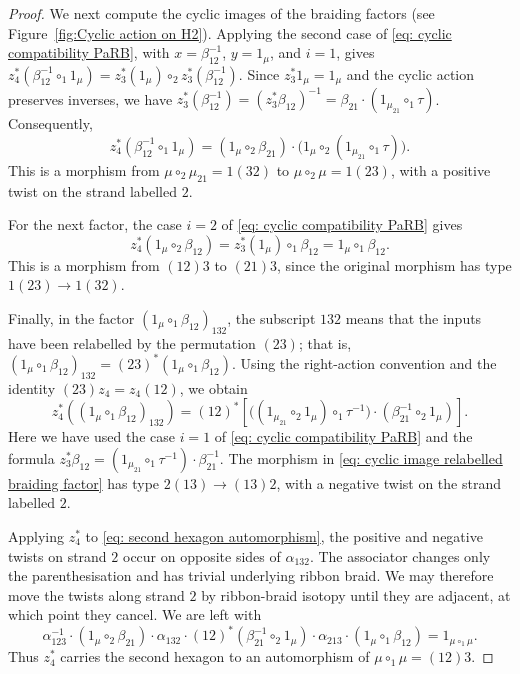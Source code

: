 \documentclass{amsart}
\newcommand{\twist}{\tau}
\theoremstyle{definition}
\numberwithin{equation}{section}
\begin{document}
\begin{proof}
We next compute the cyclic images of the braiding factors (see Figure~\ref{fig:Cyclic action on H2}). Applying
the second case of \eqref{eq: cyclic compatibility PaRB}, with
$x=\beta_{12}^{-1}$, $y=1_\mu$, and $i=1$, gives
$z_4^*(\beta_{12}^{-1}\circ_1 1_\mu)
=z_3^*(1_\mu)\circ_2z_3^*(\beta_{12}^{-1})$.
Since $z_3^*1_\mu=1_\mu$ and the cyclic action preserves inverses,
we have
$z_3^*(\beta_{12}^{-1})
=(z_3^*\beta_{12})^{-1}
=\beta_{21}\cdot(1_{\mu_{21}}\circ_1\twist)$.
Consequently,
\begin{equation}
\label{eq: cyclic image inverse braiding first insertion}
z_4^*(\beta_{12}^{-1}\circ_1 1_\mu) = (1_\mu\circ_2\beta_{21}) \cdot \bigl(1_\mu\circ_2 (1_{\mu_{21}}\circ_1\twist)\bigr).
\end{equation}
This is a morphism from
$\mu\circ_2\mu_{21}=1(32)$ to $\mu\circ_2\mu=1(23)$, with a positive twist on the strand labelled $2$.

For the next factor, the case $i=2$ of
\eqref{eq: cyclic compatibility PaRB} gives
\begin{equation}
\label{eq: cyclic image second braiding factor}
z_4^*(1_\mu\circ_2\beta_{12}) = z_3^*(1_\mu)\circ_1\beta_{12} = 1_\mu\circ_1\beta_{12}.
\end{equation}
This is a morphism from $(12)3$ to $(21)3$, since the original morphism has type $1(23)\to1(32)$.

Finally, in the factor
$(1_\mu\circ_1\beta_{12})_{132}$, the subscript $132$ means that the
inputs have been relabelled by the permutation $(23)$; that is,
$(1_\mu\circ_1\beta_{12})_{132}
=(23)^*(1_\mu\circ_1\beta_{12})$.
Using the right-action convention and the identity
$(23)z_4=z_4(12)$, we obtain
\begin{equation}
\label{eq: cyclic image relabelled braiding factor}
z_4^*((1_\mu\circ_1\beta_{12})_{132}) =(12)^*\left[\bigl((1_{\mu_{21}}\circ_2 1_\mu) \circ_1\twist^{-1}\bigr) \cdot(\beta_{21}^{-1}\circ_2 1_\mu) \right].
\end{equation}
Here we have used the case $i=1$ of \eqref{eq: cyclic compatibility PaRB} and the formula
$z_3^*\beta_{12} =(1_{\mu_{21}}\circ_1\twist^{-1}) \cdot\beta_{21}^{-1}$. The morphism in \eqref{eq: cyclic image relabelled braiding factor} has type
$2(13)\to(13)2$, with a negative twist on the strand labelled $2$.

Applying $z_4^*$ to \eqref{eq: second hexagon automorphism}, the positive and negative twists on strand $2$ occur on opposite sides of $\alpha_{132}$. The associator changes only the parenthesisation and has trivial underlying ribbon braid. We may therefore move the twists along strand $2$ by ribbon-braid isotopy until they are adjacent, at which point they cancel. We are left with
\begin{equation}
\label{eq: cyclic image second hexagon automorphism}
\alpha_{123}^{-1} \cdot(1_\mu\circ_2\beta_{21}) \cdot\alpha_{132} \cdot(12)^*(\beta_{21}^{-1}\circ_2 1_\mu) \cdot\alpha_{213} \cdot(1_\mu\circ_1\beta_{12}) =
1_{\mu\circ_1\mu}.
\end{equation}
Thus $z_4^*$ carries the second hexagon to an automorphism of $\mu\circ_1\mu=(12)3$.


\end{proof}
\end{document}
